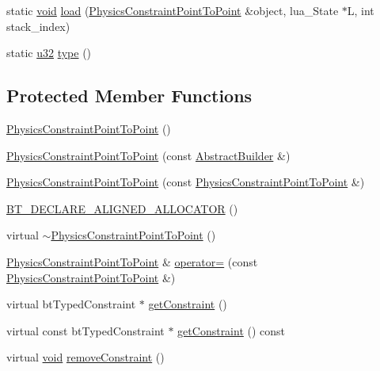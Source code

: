 \begin{DoxyCompactItemize}
\item 
static \mbox{\hyperlink{_thread_8h_af1e856da2e658414cb2456cb6f7ebc66}{void}} \mbox{\hyperlink{classnjli_1_1_physics_constraint_point_to_point_a1b48c6302604d867278645b18e4119ea}{load}} (\mbox{\hyperlink{classnjli_1_1_physics_constraint_point_to_point}{Physics\+Constraint\+Point\+To\+Point}} \&object, lua\+\_\+\+State $\ast$L, int stack\+\_\+index)
\item 
static \mbox{\hyperlink{_util_8h_a10e94b422ef0c20dcdec20d31a1f5049}{u32}} \mbox{\hyperlink{classnjli_1_1_physics_constraint_point_to_point_ac1f72e0fab59953758302de4b5c8fb72}{type}} ()
\end{DoxyCompactItemize}
\subsection*{Protected Member Functions}
\begin{DoxyCompactItemize}
\item 
\mbox{\hyperlink{classnjli_1_1_physics_constraint_point_to_point_a6fe4d9bb07a35df5e54e96762f305905}{Physics\+Constraint\+Point\+To\+Point}} ()
\item 
\mbox{\hyperlink{classnjli_1_1_physics_constraint_point_to_point_a2d1e3de4759eff8e43b414401a4508e9}{Physics\+Constraint\+Point\+To\+Point}} (const \mbox{\hyperlink{classnjli_1_1_abstract_builder}{Abstract\+Builder}} \&)
\item 
\mbox{\hyperlink{classnjli_1_1_physics_constraint_point_to_point_a6809b9b60c90768e4677b9b398963073}{Physics\+Constraint\+Point\+To\+Point}} (const \mbox{\hyperlink{classnjli_1_1_physics_constraint_point_to_point}{Physics\+Constraint\+Point\+To\+Point}} \&)
\item 
\mbox{\hyperlink{classnjli_1_1_physics_constraint_point_to_point_a07981bdbee82db7870f1fb69fbf190d6}{B\+T\+\_\+\+D\+E\+C\+L\+A\+R\+E\+\_\+\+A\+L\+I\+G\+N\+E\+D\+\_\+\+A\+L\+L\+O\+C\+A\+T\+OR}} ()
\item 
virtual \mbox{\hyperlink{classnjli_1_1_physics_constraint_point_to_point_ae32b237c28fc0dc8c0fb6a0d95ffc7be}{$\sim$\+Physics\+Constraint\+Point\+To\+Point}} ()
\item 
\mbox{\hyperlink{classnjli_1_1_physics_constraint_point_to_point}{Physics\+Constraint\+Point\+To\+Point}} \& \mbox{\hyperlink{classnjli_1_1_physics_constraint_point_to_point_a74aa555b80e55dbb4700e9f230bda563}{operator=}} (const \mbox{\hyperlink{classnjli_1_1_physics_constraint_point_to_point}{Physics\+Constraint\+Point\+To\+Point}} \&)
\item 
virtual bt\+Typed\+Constraint $\ast$ \mbox{\hyperlink{classnjli_1_1_physics_constraint_point_to_point_ac6660242268a76ff271f041fe22ea52a}{get\+Constraint}} ()
\item 
virtual const bt\+Typed\+Constraint $\ast$ \mbox{\hyperlink{classnjli_1_1_physics_constraint_point_to_point_a2ee05517ec402655c0953184dc7642b3}{get\+Constraint}} () const
\item 
virtual \mbox{\hyperlink{_thread_8h_af1e856da2e658414cb2456cb6f7ebc66}{void}} \mbox{\hyperlink{classnjli_1_1_physics_constraint_point_to_point_a337401a0a9ad667b5d7c952913c40852}{remove\+Constraint}} ()
\end{DoxyCompactItemize}
